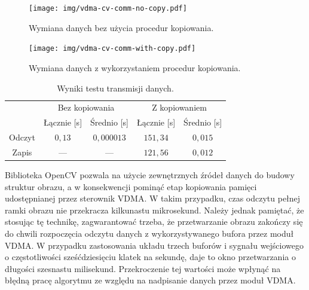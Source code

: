 \begin{figure}[H]
	\centering
	\texttt{[image: img/vdma-cv-comm-no-copy.pdf]}
	\caption{Wymiana danych bez użycia procedur kopiowania.}
	\label{fig:vdma-opencv-no-copy}
\end{figure}

\begin{figure}[H]
	\centering
	\texttt{[image: img/vdma-cv-comm-with-copy.pdf]}
	\caption{Wymiana danych z wykorzystaniem procedur kopiowania.}
	\label{fig:vdma-opencv-with-copy}
\end{figure}

\begin{table}[H]
	\caption{Wyniki testu transmisji danych.}
	\centering
	\label{tab:vdma-to-opencv}
\begin{tabular}{c|c|c|c|c|}
	\cline{2-5}
	& \multicolumn{2}{c|}{Bez kopiowania} & \multicolumn{2}{c|}{Z kopiowaniem} \\ \cline{2-5} 
	& Łącznie {[}s{]}  & Średnio {[}s{]}  & Łącznie {[}s{]}  & Średnio {[}s{]} \\ \hline
	\multicolumn{1}{|c|}{Odczyt} & $0,13$            & $0,000013$        & $151,34$           & $0,015$           \\ \hline
	\multicolumn{1}{|c|}{Zapis}  & ---              & ---              & $121,56$           & $0,012$           \\ \hline
\end{tabular}
\end{table}
Biblioteka OpenCV pozwala na użycie zewnętrznych źródeł danych do budowy struktur obrazu, a w konsekwencji pominąć etap kopiowania pamięci udostępnianej przez sterownik VDMA. 
W takim przypadku, czas odczytu pełnej ramki obrazu nie przekracza kilkunastu mikrosekund.
Należy jednak pamiętać, że stosując tę technikę, zagwarantować trzeba, że przetwarzanie obrazu zakończy się do chwili rozpoczęcia odczytu danych z wykorzystywanego bufora przez moduł VDMA. 
W przypadku zastosowania układu trzech buforów i sygnału wejściowego o częstotliwości sześćdziesięciu klatek na sekundę, daje to okno przetwarzania o długości szesnastu milisekund. 
Przekroczenie tej wartości może wpłynąć na błędną pracę algorytmu ze względu na nadpisanie danych przez moduł VDMA.

